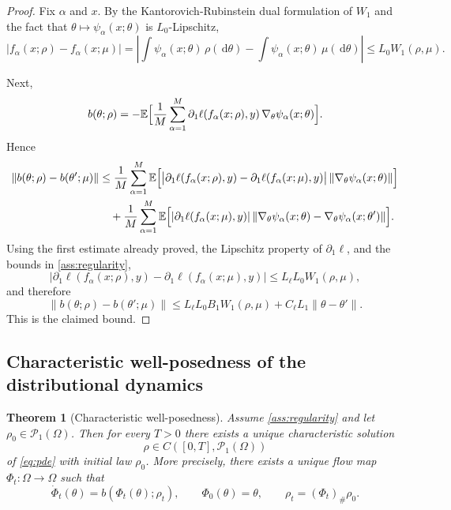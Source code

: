 \documentclass[11pt]{article}
\newtheorem{theorem}{Theorem}[section]
\theoremstyle{definition}
\newcommand{\E}{\mathbb{E}}
\newcommand{\PP}{\mathcal{P}}
\newcommand{\W}{W_1}
\newcommand{\dd}{\,\mathrm{d}}
\begin{document}
\begin{proof}
Fix $\alpha$ and $x$.
By the Kantorovich-Rubinstein dual formulation of $\W$ and the fact that
$\theta \mapsto \psi_\alpha(x;\theta)$ is $L_0$-Lipschitz,
\[
  |f_\alpha(x;\rho)-f_\alpha(x;\mu)|
  =
  \left|
    \int \psi_\alpha(x;\theta)\,\rho(\dd \theta)
    -
    \int \psi_\alpha(x;\theta)\,\mu(\dd \theta)
  \right|
  \le
  L_0 \W(\rho,\mu).
\]

Next,
\[
  b(\theta;\rho)
  =
  -
  \E
  \Bigl[
    \frac1M \sum_{\alpha=1}^M
    \partial_1 \ell(f_\alpha(x;\rho),y)\,
    \nabla_\theta \psi_\alpha(x;\theta)
  \Bigr].
\]
Hence
\begin{align*}
  \|b(\theta;\rho)-b(\theta';\mu)\|
  &\le
  \frac1M \sum_{\alpha=1}^M
  \E \Bigl[
    \bigl|
      \partial_1 \ell(f_\alpha(x;\rho),y)
      -
      \partial_1 \ell(f_\alpha(x;\mu),y)
    \bigr|
    \,
    \|\nabla_\theta \psi_\alpha(x;\theta)\|
  \Bigr]
  \\
  &\quad
  +
  \frac1M \sum_{\alpha=1}^M
  \E \Bigl[
    |\partial_1 \ell(f_\alpha(x;\mu),y)|
    \,
    \|\nabla_\theta \psi_\alpha(x;\theta)-\nabla_\theta \psi_\alpha(x;\theta')\|
  \Bigr].
\end{align*}
Using the first estimate already proved, the Lipschitz property of $\partial_1 \ell$, and the bounds in \cref{ass:regularity},
\[
  \bigl|
    \partial_1 \ell(f_\alpha(x;\rho),y)
    -
    \partial_1 \ell(f_\alpha(x;\mu),y)
  \bigr|
  \le
  L_\ell L_0 \W(\rho,\mu),
\]
and therefore
\[
  \|b(\theta;\rho)-b(\theta';\mu)\|
  \le
  L_\ell L_0 B_1 \W(\rho,\mu)
  +
  C_\ell L_1 \|\theta-\theta'\|.
\]
This is the claimed bound.
\end{proof}

\subsection{Characteristic well-posedness of the distributional dynamics}

\begin{theorem}[Characteristic well-posedness]
\label{thm:wellposed}
Assume \cref{ass:regularity} and let $\rho_0 \in \PP_1(\Omega)$.
Then for every $T>0$ there exists a unique characteristic solution
\[
  \rho \in C([0,T],\PP_1(\Omega))
\]
of \eqref{eq:pde} with initial law $\rho_0$.
More precisely, there exists a unique flow map $\Phi_t:\Omega \to \Omega$ such that
\[
  \dot{\Phi}_t(\theta)=b(\Phi_t(\theta);\rho_t),
  \qquad
  \Phi_0(\theta)=\theta,
  \qquad
  \rho_t = (\Phi_t)_\# \rho_0.
\]
\end{theorem}
\end{document}
